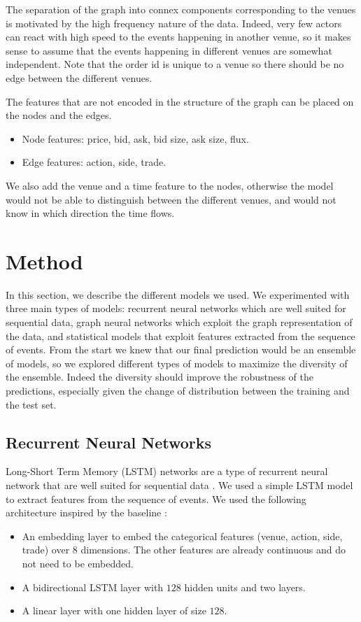 \documentclass[switch, 11pt]{article}
\begin{document}
\begin{multicols}{2}
    The separation of the graph into connex components corresponding to the venues is motivated by the high frequency nature of the data. Indeed, very few actors can react with high speed to the events happening in another venue, so it makes sense to assume that the events happening in different venues are somewhat independent. Note that the order id is unique to a venue so there should be no edge between the different venues.

    The features that are not encoded in the structure of the graph can be placed on the nodes and the edges.
    \begin{itemize}
        \item Node features: price, bid, ask, bid size, ask size, flux.
        \item Edge features: action, side, trade.
    \end{itemize}
    We also add the venue and a time feature to the nodes, otherwise the model would not be able to distinguish between the different venues, and would not know in which direction the time flows.

    \section{Method}

    In this section, we describe the different models we used. We experimented with three main types of models: recurrent neural networks which are well suited for sequential data, graph neural networks which exploit the graph representation of the data, and statistical models that exploit features extracted from the sequence of events. From the start we knew that our final prediction would be an ensemble of models, so we explored different types of models to maximize the diversity of the ensemble. Indeed the diversity should improve the robustness of the predictions, especially given the change of distribution between the training and the test set.

    \subsection{Recurrent Neural Networks}

    Long-Short Term Memory (LSTM) networks are a type of recurrent neural network that are well suited for sequential data \cite{hochreiter-1997}. We used a simple LSTM model to extract features from the sequence of events. We used the following architecture inspired by the baseline :
    \begin{itemize}
        \item An embedding layer to embed the categorical features (venue, action, side, trade) over $8$ dimensions. The other features are already continuous and do not need to be embedded.
        \item A bidirectional LSTM layer with $128$ hidden units and two layers.
        \item A linear layer with one hidden layer of size $128$.
    \end{itemize}


\end{multicols}
\end{document}
